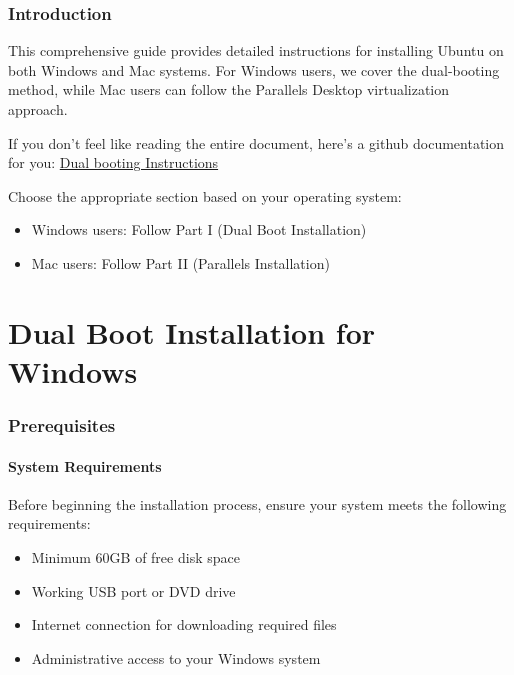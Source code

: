 \documentclass[11pt,a4paper]{article}
\newenvironment{note}
{\begin{tcolorbox}[colback=notecolor!10,colframe=notecolor,title=\textbf{Note}]}
{\end{tcolorbox}}
\begin{document}
\section{Introduction}
This comprehensive guide provides detailed instructions for installing Ubuntu on both Windows and Mac systems. For Windows users, we cover the dual-booting method, while Mac users can follow the Parallels Desktop virtualization approach. 
\begin{tcolorbox}[colback=yellow!10,colframe=orange!50!white,title=\textbf{TL;DR}]
If you don't feel like reading the entire document, here's a github documentation for you: \href{https://github.com/Dikshuy/dual-boot-Mac-Windows/tree/main}{Dual booting Instructions} 
\end{tcolorbox}

\begin{note}
Choose the appropriate section based on your operating system:
\begin{itemize}
    \item Windows users: Follow Part I (Dual Boot Installation)
    \item Mac users: Follow Part II (Parallels Installation)
\end{itemize}

\end{note}


\part{Dual Boot Installation for Windows}

\section{Prerequisites}
\subsection{System Requirements}
Before beginning the installation process, ensure your system meets the following requirements:
\begin{itemize}
    \item Minimum 60GB of free disk space
    \item Working USB port or DVD drive
    \item Internet connection for downloading required files
    \item Administrative access to your Windows system
\end{itemize}
\end{document}

